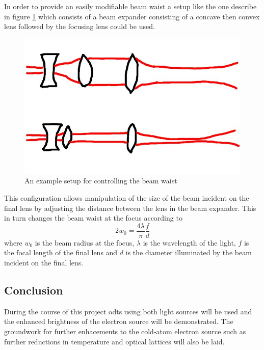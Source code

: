 In order to provide an easily modifiable beam waist a setup like the one describe in figure \ref{figs/MOT.pdf} which consists of a beam expander consisting of a concave then convex lens followed by the focusing lens could be used.

\begin{figure}[h]
	\centering
	\includegraphics[scale=0.32]{figs/waistcontrol.jpg}
	\caption[Title]{An example setup for controlling the beam waist}
	\label{figs/MOT.pdf}
\end{figure}

This configuration allows manipulation of the size of the beam incident on the final lens by adjusting the distance between the lens in the beam expander. This in turn changes the beam waist at the focus according to
\begin{equation}
2w_0=\frac{4\lambda}{\pi}\frac{f}{d}
\end{equation}
where $w_0$ is the beam radius at the focus, $\lambda$ is the wavelength of the light, $f$ is the focal length of the final lens and $d$ is the diameter illuminated by the beam incident on the final lens.

\subsection{Conclusion}
During the course of this project \glspl{odt} using both light sources will be used and the enhanced brightness of the electron source will be demonstrated. The groundwork for further enhacements to the cold-atom electron source such as further reductions in temperature and optical lattices will also be laid.
